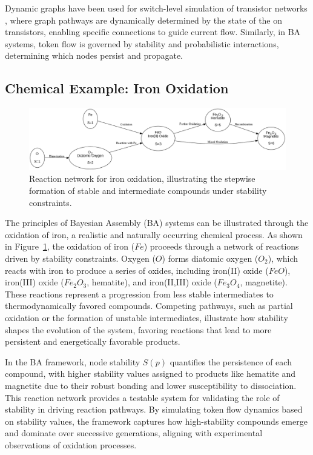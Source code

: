 \documentclass[entropy,article,submit,pdftex,moreauthors]{Definitions/mdpi}
\begin{document}
Dynamic graphs have been used for switch-level simulation of transistor networks \cite{AdlerCAD}, where graph pathways are dynamically determined by the state of the on transistors, enabling specific connections to guide current flow. Similarly, in BA systems, token flow is governed by stability and probabilistic interactions, determining which nodes persist and propagate.

\subsection{Chemical Example: Iron Oxidation}

\begin{figure}[h]
    \centering
    \includegraphics[width=1\textwidth,height=0.4\textwidth]{abc_oxi.png}
    \caption{Reaction network for iron oxidation, illustrating the stepwise formation of stable and intermediate compounds under stability constraints.}
    \label{fig:abc_oxi}
\end{figure}

The principles of Bayesian Assembly (BA) systems can be illustrated through the oxidation of iron, a realistic and naturally occurring chemical process. As shown in Figure~\ref{fig:abc_oxi}, the oxidation of iron (\(Fe\)) proceeds through a network of reactions driven by stability constraints. Oxygen (\(O\)) forms diatomic oxygen (\(O_2\)), which reacts with iron to produce a series of oxides, including iron(II) oxide (\(FeO\)), iron(III) oxide (\(Fe_2O_3\), hematite), and iron(II,III) oxide (\(Fe_3O_4\), magnetite). These reactions represent a progression from less stable intermediates to thermodynamically favored compounds. Competing pathways, such as partial oxidation or the formation of unstable intermediates, illustrate how stability shapes the evolution of the system, favoring reactions that lead to more persistent and energetically favorable products.

In the BA framework, node stability \(S(p)\) quantifies the persistence of each compound, with higher stability values assigned to products like hematite and magnetite due to their robust bonding and lower susceptibility to dissociation. This reaction network provides a testable system for validating the role of stability in driving reaction pathways. By simulating token flow dynamics based on stability values, the framework captures how high-stability compounds emerge and dominate over successive generations, aligning with experimental observations of oxidation processes.
\end{document}
